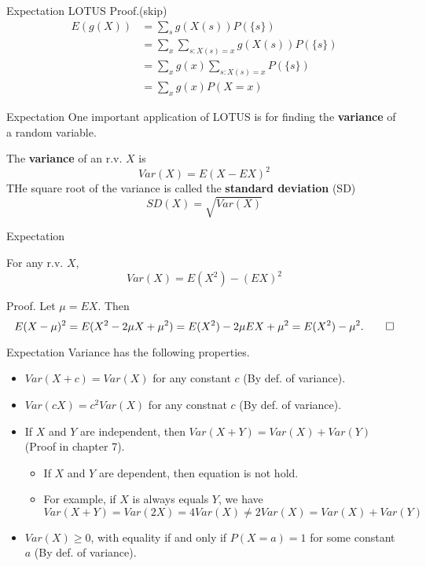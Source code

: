 \documentclass[8pt]{beamer}
\newcommand{\tb}[1]{\textbf{#1}}
\begin{document}
\begin{frame}{Expectation}
    LOTUS Proof.(skip)
    \[
    \begin{aligned}
        E(g(X)) &= \sum_s g(X(s))P(\{s\}) \\
        &= \sum_x \sum_{s:X(s)=x} g(X(s)) P(\{s\})\\
        &= \sum_x g(x) \sum_{s:X(s)=x} P(\{s\}) \\
        &= \sum_x g(x) P(X=x)
    \end{aligned}
    \]
\end{frame}

\begin{frame}{Expectation}
    One important application of LOTUS is for finding the \tb{variance} of a random variable.
    \begin{definition}
        The \tb{variance} of an r.v. $X$ is
        \[ Var(X) = E(X-EX)^2\]
        THe square root of the variance is called the \tb{standard deviation} (SD)
        \[SD(X) = \sqrt{Var(X)}\]
    \end{definition}
\end{frame}

\begin{frame}{Expectation}
    \begin{theorem}
        For any r.v. $X$,
        \[
            Var(X) = E(X^2) - (EX)^2
        \]
    \end{theorem}
    Proof. Let $\mu = EX$. Then
    \[
        E(X-\mu)^2 = E(X^2 - 2\mu X + \mu^2) = E(X^2) - 2\mu EX +\mu^2 = E(X^2) - \mu^2. \qed
    \]
\end{frame}

\begin{frame}{Expectation}
    Variance has the following properties.
    \begin{itemize}
        \item $Var(X+c) = Var(X)$ for any constant $c$ (By def. of variance).
        \item $Var(cX) = c^2 Var(X)$ for any constnat $c$ (By def. of variance).
        \item If $X$ and $Y$ are independent, then $Var(X+Y) = Var(X) + Var(Y)$ (Proof in chapter 7).
        \begin{itemize}
            \item If $X$ and $Y$ are dependent, then equation is not hold.
            \item For example, if $X$ is always equals $Y$, we have \[
                Var(X+Y) = Var(2X) = 4Var(X) \neq 2Var(X) = Var(X) + Var(Y)
            \]
        \end{itemize}
        \item $Var(X) \geq 0$, with equality if and only if $P(X=a)=1$ for some constant $a$ (By def. of variance).
    \end{itemize}
\end{frame}
\end{document}
